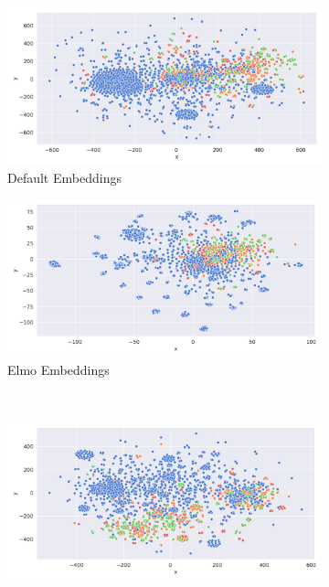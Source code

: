 \documentclass[11pt,a4paper]{article}
\begin{document}
\begin{figure}[!ht]
\begin{subfigure}{0.5\linewidth}
  \centering
  \includegraphics[width=\linewidth]{img/word2vec-embeddings.png}
  \caption{Default Embeddings}
  \label{fig:sfig1}
\end{subfigure}%
\begin{subfigure}{0.5\linewidth}
  \centering
  \includegraphics[width=\linewidth]{img/elmo-embeddings.png}
  \caption{Elmo Embeddings}
  \label{fig:sfig2}
\end{subfigure}\\
\begin{subfigure}{0.5\linewidth}
  \centering
  \includegraphics[width=\linewidth]{img/bert-embeddings.png}

\end{subfigure}
\end{figure}
\end{document}
